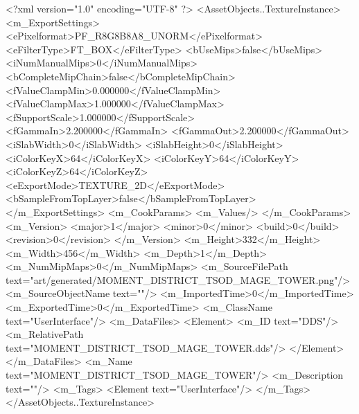 <?xml version="1.0" encoding="UTF-8" ?>
<AssetObjects..TextureInstance>
	<m_ExportSettings>
		<ePixelformat>PF_R8G8B8A8_UNORM</ePixelformat>
		<eFilterType>FT_BOX</eFilterType>
		<bUseMips>false</bUseMips>
		<iNumManualMips>0</iNumManualMips>
		<bCompleteMipChain>false</bCompleteMipChain>
		<fValueClampMin>0.000000</fValueClampMin>
		<fValueClampMax>1.000000</fValueClampMax>
		<fSupportScale>1.000000</fSupportScale>
		<fGammaIn>2.200000</fGammaIn>
		<fGammaOut>2.200000</fGammaOut>
		<iSlabWidth>0</iSlabWidth>
		<iSlabHeight>0</iSlabHeight>
		<iColorKeyX>64</iColorKeyX>
		<iColorKeyY>64</iColorKeyY>
		<iColorKeyZ>64</iColorKeyZ>
		<eExportMode>TEXTURE_2D</eExportMode>
		<bSampleFromTopLayer>false</bSampleFromTopLayer>
	</m_ExportSettings>
	<m_CookParams>
		<m_Values/>
	</m_CookParams>
	<m_Version>
		<major>1</major>
		<minor>0</minor>
		<build>0</build>
		<revision>0</revision>
	</m_Version>
	<m_Height>332</m_Height>
	<m_Width>456</m_Width>
	<m_Depth>1</m_Depth>
	<m_NumMipMaps>0</m_NumMipMaps>
	<m_SourceFilePath text="art/generated/MOMENT_DISTRICT_TSOD_MAGE_TOWER.png"/>
	<m_SourceObjectName text=""/>
	<m_ImportedTime>0</m_ImportedTime>
	<m_ExportedTime>0</m_ExportedTime>
	<m_ClassName text="UserInterface"/>
	<m_DataFiles>
		<Element>
			<m_ID text="DDS"/>
			<m_RelativePath text="MOMENT_DISTRICT_TSOD_MAGE_TOWER.dds"/>
		</Element>
	</m_DataFiles>
	<m_Name text="MOMENT_DISTRICT_TSOD_MAGE_TOWER"/>
	<m_Description text=""/>
	<m_Tags>
		<Element text="UserInterface"/>
	</m_Tags>
</AssetObjects..TextureInstance>
